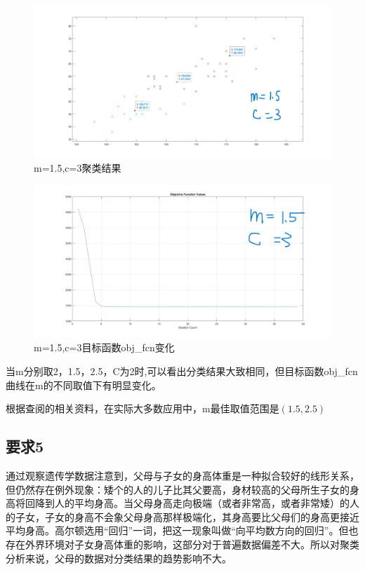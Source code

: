 \documentclass{article}
\begin{document}
\begin{figure}[H]
    \centering
    \includegraphics[width=1\textwidth]{image/Figure13_1.jpg}
    \caption{m=1.5,c=3聚类结果}
    \label{Figure13_1}
\end{figure}
\begin{figure}[H]
    \centering
    \includegraphics[width=1\textwidth]{image/Figure13_2.jpg}
    \caption{m=1.5,c=3目标函数obj\_fcn变化}
    \label{Figure13_2}
\end{figure}


当m分别取2，1.5，2.5，C为2时,可以看出分类结果大致相同，但目标函数obj\_fcn曲线在m的不同取值下有明显变化。

根据查阅的相关资料，在实际大多数应用中，m最佳取值范围是$(1.5,2.5)$

\subsection{要求5}
通过观察遗传学数据注意到，父母与子女的身高体重是一种拟合较好的线形关系，但仍然存在例外现象：矮个的人的儿子比其父要高，身材较高的父母所生子女的身高将回降到人的平均身高。当父母身高走向极端（或者非常高，或者非常矮）的人的子女，子女的身高不会象父母身高那样极端化，其身高要比父母们的身高更接近平均身高。高尔顿选用“回归”一词，把这一现象叫做“向平均数方向的回归”。但也存在外界环境对子女身高体重的影响，这部分对于普遍数据偏差不大。所以对聚类分析来说，父母的数据对分类结果的趋势影响不大。
\end{document}
